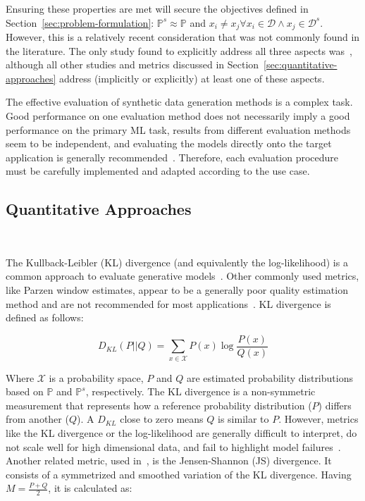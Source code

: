 Ensuring these properties are met will secure the objectives defined in
Section~\ref{sec:problem-formulation}: $\mathbb{P}^s \approx
\mathbb{P}$ and $x_i \neq x_j \forall x_i \in \mathcal{D} \wedge x_j \in
\mathcal{D}^s$. However, this is a relatively recent consideration that was
not commonly found in the literature. The only study found to explicitly
address all three aspects was~\cite{alaa2022faithful}, although all other
studies and metrics discussed in Section~\ref{sec:quantitative-approaches}
address (implicitly or explicitly) at least one of these aspects.

The effective evaluation of synthetic data generation methods is a complex
task. Good performance on one evaluation method does not
necessarily imply a good performance on the primary ML task, results from
different evaluation methods seem to be independent, and evaluating the models
directly onto the target application is generally
recommended~\cite{theis2016note}. Therefore, each evaluation procedure must be
carefully implemented and adapted according to the use case.

\subsection{Quantitative Approaches}~\label{sec:quantitative-approaches}

The Kullback-Leibler (KL) divergence (and equivalently the log-likelihood) is a
common approach to evaluate generative models~\cite{theis2016note}. Other
commonly used metrics, like Parzen window estimates, appear to be a generally
poor quality estimation method and are not recommended for most
applications~\cite{theis2016note}. KL divergence is defined as follows:

\begin{equation}
    D_{KL}(P||Q) = \sum_{x\in\mathcal{X}}P(x)\log{\frac{P(x)}{Q(x)}}
\end{equation}

Where $\mathcal{X}$ is a probability space, $P$ and $Q$ are estimated
probability distributions based on $\mathbb{P}$ and $\mathbb{P}^s$,
respectively. The KL divergence is a non-symmetric measurement that represents
how a reference probability distribution ($P$) differs from another
($Q$). A $D_{KL}$ close to zero means $Q$ is similar to $P$. However, metrics
like the KL divergence or the log-likelihood are generally difficult to
interpret, do not scale well for high dimensional data, and fail to
highlight model failures~\cite{alaa2022faithful}. Another related metric, used
in~\cite{zhao2021ctab}, is the Jensen-Shannon (JS) divergence. It consists of
a symmetrized and smoothed variation of the KL divergence. Having
$M=\frac{P+Q}{2}$, it is calculated as:

